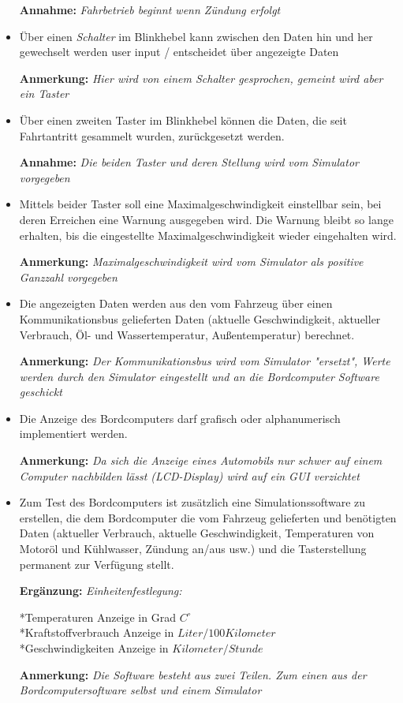 \documentclass[a4paper,12pt]{article}
\begin{document}
\begin{itemize}
\textbf{Annahme:} \emph{Fahrbetrieb beginnt wenn Zündung erfolgt}

\item Über einen \emph{Schalter} im Blinkhebel kann zwischen den Daten hin und her gewechselt werden 
user input / entscheidet über angezeigte Daten

\textbf{Anmerkung:} \emph{Hier wird von einem Schalter gesprochen, gemeint wird aber ein Taster}

\item Über einen zweiten Taster im Blinkhebel können die Daten, die seit Fahrtantritt gesammelt wurden, zurückgesetzt werden.

\textbf{Annahme:} \emph{Die beiden Taster und deren Stellung wird vom Simulator vorgegeben}

\item Mittels beider Taster soll eine Maximalgeschwindigkeit einstellbar sein, bei deren Erreichen eine Warnung ausgegeben wird. Die Warnung bleibt so lange erhalten, bis die eingestellte Maximalgeschwindigkeit wieder eingehalten wird.

\textbf{Anmerkung:} \emph{Maximalgeschwindigkeit wird vom Simulator als positive Ganzzahl vorgegeben}

\item Die angezeigten Daten werden aus den vom Fahrzeug über einen Kommunikations­bus gelieferten Daten (aktuelle Geschwindigkeit, aktueller Verbrauch, Öl- und Wassertemperatur, Außentemperatur) berechnet. 

\textbf{Anmerkung:} \emph{Der Kommunikationsbus wird vom Simulator "ersetzt", Werte werden durch den Simulator eingestellt und an die Bordcomputer Software geschickt}

\item Die Anzeige des Bordcomputers darf grafisch oder alphanumerisch implementiert werden.

\textbf{Anmerkung:} \emph{Da sich die Anzeige eines Automobils nur schwer auf einem Computer nachbilden lässt (LCD-Display) wird auf ein GUI verzichtet}

\item Zum Test des Bordcomputers ist zusätzlich eine Simulationssoftware zu erstellen, die dem Bordcomputer die vom Fahrzeug gelieferten und benötigten Daten (aktueller Verbrauch, aktuelle Geschwindigkeit, Temperaturen von Motoröl und Kühlwasser, Zündung an/aus usw.) und die Tasterstellung permanent zur Verfügung stellt.

\textbf{Ergänzung:} \emph{Einheitenfestlegung:}

*Temperaturen Anzeige in Grad $C^{\circ}$\\
*Kraftstoffverbrauch Anzeige in $Liter/100 Kilometer$\\
*Geschwindigkeiten Anzeige in $Kilometer/Stunde$

\textbf{Anmerkung:} \emph{Die Software besteht aus zwei Teilen. Zum einen aus der Bordcomputersoftware selbst und einem Simulator}

\end{itemize}
\end{document}
